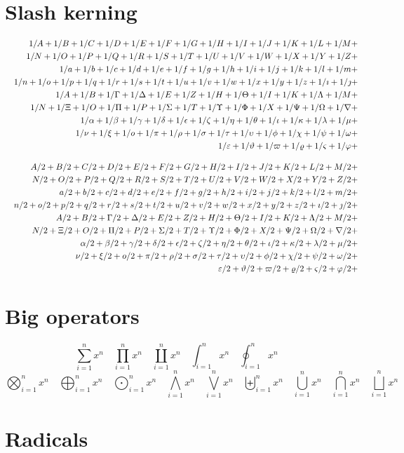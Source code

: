 \documentclass[fleqn]{article}
\def\test#1{#1}
\def\testupperi{%
  \test A \test B \test C \test D \test E \test F \test G \test H
  \test I \test J \test K \test L \test M }
\def\testupperii{%
  \test N \test O \test P \test Q \test R \test S \test T \test U
  \test V \test W \test X \test Y \test Z }
\def\testloweri{%
  \test a \test b \test c \test d \test e \test f \test g \test h
  \test i \test j \test k \test l \test m }
\def\testlowerii{%
  \test n \test o \test p \test q \test r \test s \test t \test u
  \test v \test w \test x \test y \test z 
  \test\imath \test\jmath }
\def\testupgreeki{%
  \test A \test B \test\Gamma \test\Delta \test E \test Z \test H
  \test\Theta \test I \test K \test\Lambda \test M }
\def\testupgreekii{%
  \test N \test\Xi \test O \test\Pi \test P \test\Sigma \test T
  \test\Upsilon \test\Phi \test X \test\Psi \test\Omega 
  \test\nabla }
\def\testlowgreeki{%
  \test\alpha \test\beta \test\gamma \test\delta \test\epsilon
  \test\zeta \test\eta \test\theta \test\iota \test\kappa \test\lambda
  \test\mu }
\def\testlowgreekii{%
  \test\nu \test\xi \test o \test\pi \test\rho \test\sigma \test\tau
  \test\upsilon \test\phi \test\chi \test\psi \test\omega }
\def\testlowgreekiii{%
  \test\varepsilon \test\vartheta \test\varpi \test\varrho
  \test\varsigma \test\varphi}
\begin{document}
\clearpage
\section{Slash kerning}

\def\test#1{1/#1+}
\begin{eqnarray*}
  && {\testupperi}\\
  && {\testupperii}\\
  && {\testloweri}\\ 
  && {\testlowerii}\\ 
  && {\testupgreeki}\\
  && {\testupgreekii}\\
  && {\testlowgreeki}\\
  && {\testlowgreekii}\\
  && {\testlowgreekiii}
\end{eqnarray*}

\def\test#1{#1/2+}
\begin{eqnarray*}
  && {\testupperi}\\
  && {\testupperii}\\
  && {\testloweri}\\ 
  && {\testlowerii}\\ 
  && {\testupgreeki}\\
  && {\testupgreekii}\\
  && {\testlowgreeki}\\
  && {\testlowgreekii}\\
  && {\testlowgreekiii}
\end{eqnarray*}


\clearpage
\section{Big operators}

\def\testop#1{#1_{i=1}^{n} x^{n} \quad}
\begin{displaymath}
  \testop\sum 
  \testop\prod 
  \testop\coprod 
  \testop\int 
  \testop\oint
\end{displaymath}
\begin{displaymath}
  \testop\bigotimes 
  \testop\bigoplus
  \testop\bigodot
  \testop\bigwedge 
  \testop\bigvee 
  \testop\biguplus 
  \testop\bigcup 
  \testop\bigcap 
  \testop\bigsqcup 
\end{displaymath}


\section{Radicals}
\end{document}
